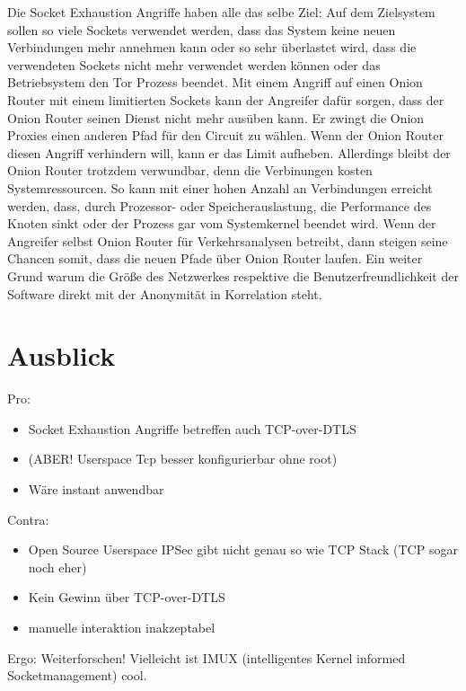 \documentclass[fleqn,envcountsame,runningheads,10pt,a4paper]{llncs}
\begin{document}
Die Socket Exhaustion Angriffe haben alle das selbe Ziel: Auf dem Zielsystem sollen so viele Sockets verwendet werden, dass das System keine neuen Verbindungen mehr annehmen kann oder so sehr überlastet wird, dass die verwendeten Sockets nicht mehr verwendet werden können oder das Betriebsystem den Tor Prozess beendet. Mit einem Angriff auf einen Onion Router mit einem limitierten Sockets kann der Angreifer dafür sorgen, dass der Onion Router seinen Dienst nicht mehr ausüben kann. Er zwingt die Onion Proxies einen anderen Pfad für den Circuit zu wählen. Wenn der Onion Router diesen Angriff verhindern will, kann er das Limit aufheben. Allerdings bleibt der Onion Router trotzdem verwundbar, denn die Verbinungen kosten  Systemressourcen. So kann mit einer hohen Anzahl an Verbindungen erreicht werden, dass, durch Prozessor- oder Speicherauslastung, die Performance des Knoten sinkt oder der Prozess gar vom Systemkernel beendet wird. Wenn der Angreifer selbst Onion Router für Verkehrsanalysen betreibt, dann steigen seine Chancen somit, dass die neuen Pfade über Onion Router laufen. Ein weiter Grund warum die Größe des Netzwerkes respektive die Benutzerfreundlichkeit der Software direkt mit der Anonymität in Korrelation steht.

\section{Ausblick}


Pro:
\begin{itemize}
 \item Socket Exhaustion Angriffe betreffen auch TCP-over-DTLS
 \item (ABER! Userspace Tcp besser konfigurierbar ohne root)
 \item Wäre instant anwendbar
\end{itemize}
Contra:
\begin{itemize}
 \item Open Source Userspace IPSec gibt nicht genau so wie TCP Stack (TCP sogar noch eher)
 \item Kein Gewinn über  TCP-over-DTLS
 \item manuelle interaktion inakzeptabel 
\end{itemize}
Ergo: Weiterforschen! Vielleicht ist IMUX (intelligentes Kernel informed Socketmanagement) cool.







\end{document}
